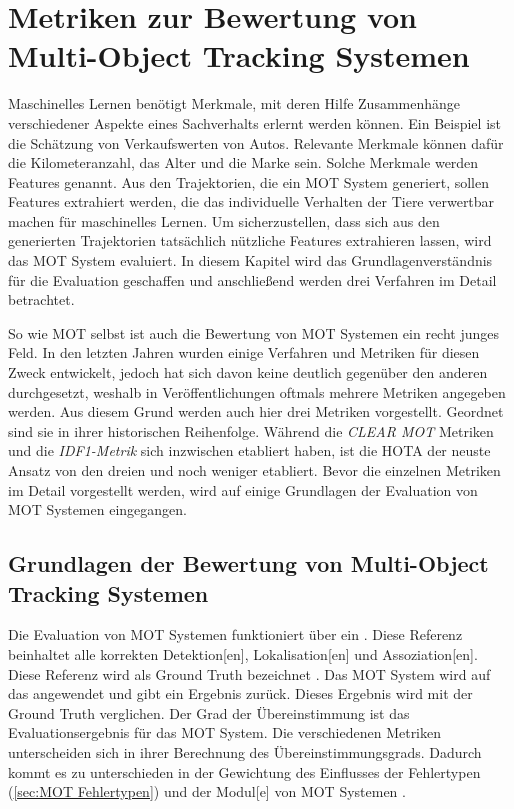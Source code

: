 \section{Metriken zur Bewertung von Multi-Object Tracking Systemen} \label{sec:MOT Metrics}

Maschinelles Lernen benötigt Merkmale, mit deren Hilfe Zusammenhänge verschiedener Aspekte eines Sachverhalts erlernt werden können. Ein Beispiel ist die Schätzung von Verkaufswerten von Autos. Relevante Merkmale können dafür die Kilometeranzahl, das Alter und die Marke sein. Solche Merkmale werden Features genannt. Aus den Trajektorien, die ein MOT System generiert, sollen Features extrahiert werden, die das individuelle Verhalten der Tiere verwertbar machen für maschinelles Lernen. Um sicherzustellen, dass sich aus den generierten Trajektorien tatsächlich nützliche Features extrahieren lassen, wird das MOT System evaluiert. In diesem Kapitel wird das Grundlagenverständnis für die Evaluation geschaffen und anschließend werden drei Verfahren im Detail betrachtet. \par

So wie \gls{MOT} selbst ist auch die Bewertung von \gls{MOT} Systemen ein recht junges Feld. In den letzten Jahren wurden einige Verfahren und Metriken für diesen Zweck entwickelt, jedoch hat sich davon keine deutlich gegenüber den anderen durchgesetzt, weshalb in Veröffentlichungen oftmals mehrere Metriken angegeben werden. Aus diesem Grund werden auch hier drei Metriken vorgestellt. Geordnet sind sie in ihrer historischen Reihenfolge. Während die  \textit{\acrshort{CLEAR} \gls{MOT}} Metriken \cite{CLEAR.2008} und die \textit{\gls{IDF1}-Metrik} \cite{IDF1} sich inzwischen etabliert haben, ist die \gls{HOTA} \cite{HOTA} der neuste Ansatz von den dreien und noch weniger etabliert. Bevor die einzelnen Metriken im Detail vorgestellt werden, wird auf einige Grundlagen der Evaluation von \gls{MOT} Systemen eingegangen.

\subsection{Grundlagen der Bewertung von Multi-Object Tracking Systemen} \label{sec:MOT GT}
Die Evaluation von \gls{MOT} Systemen funktioniert über ein . Diese Referenz beinhaltet alle korrekten \gls{Detektion}[en], \gls{Lokalisation}[en] und \gls{Assoziation}[en]. Diese Referenz wird als \gls{Ground Truth} bezeichnet \cite{HOTA}. Das \gls{MOT} System wird auf das  angewendet und gibt ein Ergebnis zurück. Dieses Ergebnis wird mit der \gls{Ground Truth} verglichen. Der Grad der Übereinstimmung ist das Evaluationsergebnis für das \gls{MOT} System. Die verschiedenen Metriken unterscheiden sich in ihrer Berechnung des Übereinstimmungsgrads. Dadurch kommt es zu unterschieden in der Gewichtung des Einflusses der Fehlertypen (\autoref{sec:MOT Fehlertypen}) und der \gls{Modul}[e] von \gls{MOT} Systemen \cite{HOTA, IDF1, CLEAR.2008}.\par

